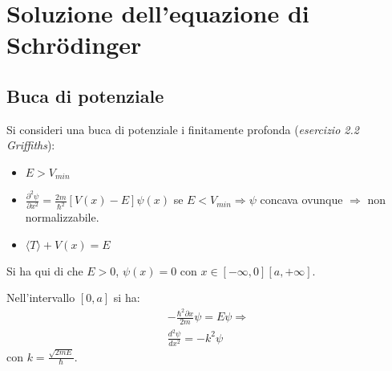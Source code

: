 \chapter{Soluzione dell'equazione di Schrödinger} %
\section{Buca di potenziale} %
Si consideri una buca di potenziale i finitamente profonda (\emph{esercizio 2.2 Griffiths}):
\begin{itemize}
\item $E>V_{min}$
\item $\frac{\partial ^2\psi }{\partial x^2}=\frac{2m}{\hbar ^2}\left[V\left(x\right)-E\right]\psi \left(x\right)$ se $E<V_{min} \Longrightarrow \psi $ concava ovunque $\Longrightarrow $ non normalizzabile.
\item $\langle T \rangle + V\left(x\right)=E$
\end{itemize}

Si ha qui di che $E>0$, $\psi \left(x\right)=0$ con $x\in \left[-\infty ,0\right]\left[a, +\infty \right]$.

Nell'intervallo $\left[0,a\right]$ si ha:
\begin{equation}\begin{split}
-\frac{\hbar ^2\partial x}{2m}\psi =E\psi \Longrightarrow \\
\frac{d^2\psi }{dx^2}=-k^2\psi 
\end{split}\end{equation}
con $k=\frac{\sqrt{2mE}}{\hbar }$.

